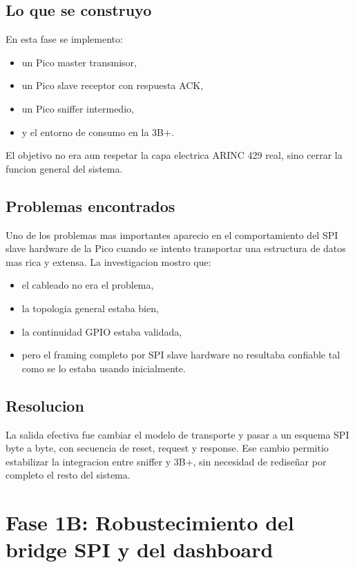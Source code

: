 \documentclass[12pt,a4paper,oneside]{report}
\begin{document}
\section{Lo que se construyo}

En esta fase se implemento:

\begin{itemize}[leftmargin=1.2cm]
    \item un Pico master transmisor,
    \item un Pico slave receptor con respuesta ACK,
    \item un Pico sniffer intermedio,
    \item y el entorno de consumo en la 3B+.
\end{itemize}

El objetivo no era aun respetar la capa electrica ARINC 429 real, sino cerrar la funcion general del sistema.

\section{Problemas encontrados}

Uno de los problemas mas importantes aparecio en el comportamiento del SPI slave hardware de la Pico cuando se intento transportar una estructura de datos mas rica y extensa. La investigacion mostro que:

\begin{itemize}[leftmargin=1.2cm]
    \item el cableado no era el problema,
    \item la topologia general estaba bien,
    \item la continuidad GPIO estaba validada,
    \item pero el framing completo por SPI slave hardware no resultaba confiable tal como se lo estaba usando inicialmente.
\end{itemize}

\section{Resolucion}

La salida efectiva fue cambiar el modelo de transporte y pasar a un esquema SPI byte a byte, con secuencia de reset, request y response. Ese cambio permitio estabilizar la integracion entre sniffer y 3B+, sin necesidad de rediseñar por completo el resto del sistema.

\chapter{Fase 1B: Robustecimiento del bridge SPI y del dashboard}
\end{document}
